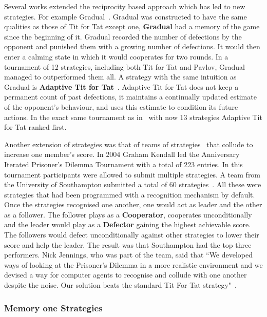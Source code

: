 \documentclass{article}
\theoremstyle{definition}
\begin{document}
Several works extended the reciprocity based approach which has led to new
strategies. For example Gradual~\cite{Beaufils1997}. Gradual was constructed to
have the same qualities as those of Tit for Tat except one,
\textbf{Gradual} had a memory of the game since the beginning of it. Gradual
recorded the number of defections by the opponent and punished them with a
growing number of defections. It would then enter a calming state in which it
would cooperates for two rounds. In a tournament of 12 strategies, including
both Tit for Tat and Pavlov, Gradual managed to outperformed them all. A
strategy with the same intuition as Gradual is \textbf{Adaptive Tit for
Tat}~\cite{tzafestas-2000a}. Adaptive Tit for Tat does not keep a permanent
count of past defections, it maintains a continually updated estimate of the
opponent’s behaviour, and uses this estimate to condition its future actions. In
the exact same tournament as in~\cite{Beaufils1997} with now 13 strategies Adaptive
Tit for Tat ranked first.

Another extension of strategies was that of teams of
strategies~\cite{J.P.Delahaye1993Lp, J.P.Delahaye1995LIeP, A.Rogers2007Ctpw}
that collude to increase one member's score. In 2004 Graham Kendall led the
Anniversary Iterated Prisoner's Dilemma Tournament with a total of 223 entries.
In this tournament participants were allowed to submit multiple strategies. A
team from the University of Southampton submitted a total of 60
strategies~\cite{A.Rogers2007Ctpw}. All these were strategies that had been
programmed with a recognition mechanism by default. Once the strategies
recognised one another, one would act as leader and the other as a follower. The
follower plays as a \textbf{Cooperator}, cooperates unconditionally and the
leader would play as a \textbf{Defector} gaining the highest achievable score.
The followers would defect unconditionally against other strategies to lower
their score and help the leader. The result was that Southampton had the top
three performers. Nick Jennings, who was part of the team, said that ``We
developed ways of looking at the Prisoner's Dilemma in a more realistic
environment and we devised a way for computer agents to recognise and collude
with one another despite the noise. Our solution beats the standard Tit For Tat
strategy"~\cite{southampton_blog}.

\subsubsection{Memory one Strategies}\label{subsection:memory_one}
\end{document}
